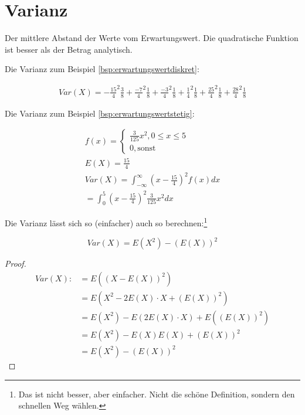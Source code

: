 \documentclass{tufte-handout}
\theoremstyle{own}
\begin{document}
\section{Varianz}

Der mittlere Abstand der Werte vom Erwartungswert. Die quadratische Funktion ist besser als der Betrag analytisch.

Die Varianz zum Beispiel \autoref{bsp:erwartungswertdiskret}:

\begin{gather*}
Var(X) = - \frac{15}{4} ^2 \frac{3}{8} + \frac{-7}{4}^2 \frac{1}{8} + \frac{-3}{4}^2 \frac{1}{8} + \frac{1}{4}^2 \frac{1}{8} + \frac{25}{4}^2 \frac{1}{8} + \frac{28}{4}^2 \frac{1}{8}
\end{gather*}

Die Varianz zum Beispiel \ref{bsp:erwartungswertstetig}:

\begin{gather*}
	f(x) = \begin{cases} 
	\frac{3}{125}x^2, 0 \leq x \leq 5 \\
	0, \text{sonst}
	\end{cases} \\
	E(X) = \frac{15}{4} \\
	Var(X) = \int_{-\infty}^\infty (x - \frac{15}{4})^2 f(x) dx \\
	= \int_0^5 (x - \frac{15}{4})^2 \frac{3}{125} x^2 dx
\end{gather*}

Die Varianz lässt sich so (einfacher) auch so berechnen:\footnote{Das ist nicht besser, aber einfacher. Nicht die schöne Definition, sondern den schnellen Weg wählen.}

\begin{equation}
\label{var:einfach}
Var(X) = E(X^2) - (E(X))^2 
\end{equation}

\begin{proof}
\begin{align*}
Var(X) :&= E((X - E(X))^2) \\
&= E(X^2 - 2E(X) \cdot X  + (E(X))^2) \\
&= E(X^2) - E(2E(X)\cdot X) + E((E(X))^2) \\
&= E(X^2) - E(X)E(X) + (E(X))^2 \\
&= E(X^2) - (E(X))^2
\end{align*}
\end{proof}




\end{document}

